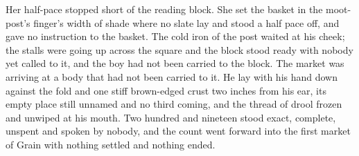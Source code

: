 Her half-pace stopped short of the reading block. She set the basket in the moot-post's finger's width of shade where no slate lay and stood a half pace off, and gave no instruction to the basket. The cold iron of the post waited at his cheek; the stalls were going up across the square and the block stood ready with nobody yet called to it, and the boy had not been carried to the block. The market was arriving at a body that had not been carried to it. He lay with his hand down against the fold and one stiff brown-edged crust two inches from his ear, its empty place still unnamed and no third coming, and the thread of drool frozen and unwiped at his mouth. Two hundred and nineteen stood exact, complete, unspent and spoken by nobody, and the count went forward into the first market of Grain with nothing settled and nothing ended.
